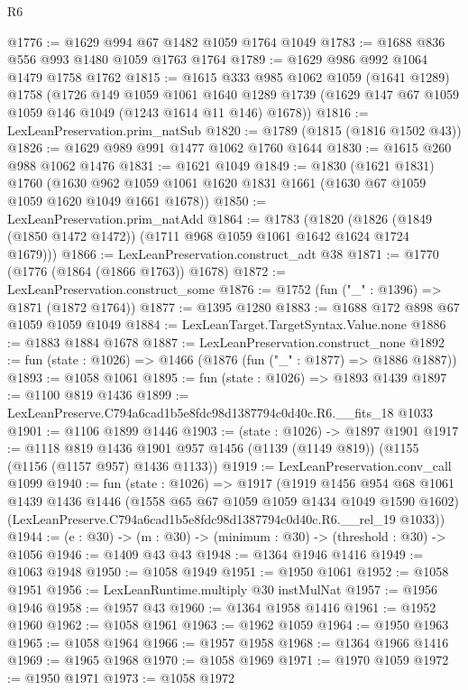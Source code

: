 \begin{lexlean}{R6}
\begin{coremodule}
@1776 := @1629 @994 @67 @1482 @1059 @1764 @1049
@1783 := @1688 @836 @556 @993 @1480 @1059 @1763 @1764
@1789 := @1629 @986 @992 @1064 @1479 @1758 @1762
@1815 := @1615
    @333
    @985
    @1062
    @1059
    (@1641 @1289)
    @1758
    (@1726
      @149
      @1059
      @1061
      @1640
      @1289
      @1739
      (@1629 @147 @67 @1059 @1059 @146 @1049 (@1243 @1614 @11 @146) @1678))
@1816 := LexLeanPreservation.prim_natSub
@1820 := @1789 (@1815 (@1816 @1502 @43))
@1826 := @1629 @989 @991 @1477 @1062 @1760 @1644
@1830 := @1615 @260 @988 @1062 @1476
@1831 := @1621 @1049
@1849 := @1830
    (@1621 @1831)
    @1760
    (@1630 @962 @1059 @1061 @1620 @1831 @1661 (@1630 @67 @1059 @1059 @1620 @1049 @1661 @1678))
@1850 := LexLeanPreservation.prim_natAdd
@1864 := @1783
    (@1820 (@1826 (@1849 (@1850 @1472 @1472)) (@1711 @968 @1059 @1061 @1642 @1624 @1724 @1679)))
@1866 := LexLeanPreservation.construct_adt @38
@1871 := @1770 (@1776 (@1864 (@1866 @1763)) @1678)
@1872 := LexLeanPreservation.construct_some
@1876 := @1752 (fun ("_" : @1396) => @1871 (@1872 @1764))
@1877 := @1395 @1280
@1883 := @1688 @172 @898 @67 @1059 @1059 @1049
@1884 := LexLeanTarget.TargetSyntax.Value.none
@1886 := @1883 @1884 @1678
@1887 := LexLeanPreservation.construct_none
@1892 := fun (state : @1026) => @1466 (@1876 (fun ("_" : @1877) => @1886 @1887))
@1893 := @1058 @1061
@1895 := fun (state : @1026) => @1893 @1439
@1897 := @1100 @819 @1436
@1899 := LexLeanPreserve.C794a6cad1b5e8fdc98d1387794c0d40c.R6.__fits_18 @1033
@1901 := @1106 @1899 @1446
@1903 := (state : @1026) -> @1897 @1901
@1917 := @1118
    @819
    @1436
    @1901
    @957
    @1456
    (@1139 (@1149 @819))
    (@1155 (@1156 (@1157 @957) @1436 @1133))
@1919 := LexLeanPreservation.conv_call @1099
@1940 := fun (state : @1026) =>
  @1917
    (@1919
      @1456
      @954
      @68
      @1061
      @1439
      @1436
      @1446
      (@1558 @65 @67 @1059 @1059 @1434 @1049 @1590 @1602)
      (LexLeanPreserve.C794a6cad1b5e8fdc98d1387794c0d40c.R6.__rel_19 @1033))
@1944 := (e : @30) -> (m : @30) -> (minimum : @30) -> (threshold : @30) -> @1056
@1946 := @1409 @43 @43
@1948 := @1364 @1946 @1416
@1949 := @1063 @1948
@1950 := @1058 @1949
@1951 := @1950 @1061
@1952 := @1058 @1951
@1956 := LexLeanRuntime.multiply @30 instMulNat
@1957 := @1956 @1946
@1958 := @1957 @43
@1960 := @1364 @1958 @1416
@1961 := @1952 @1960
@1962 := @1058 @1961
@1963 := @1962 @1059
@1964 := @1950 @1963
@1965 := @1058 @1964
@1966 := @1957 @1958
@1968 := @1364 @1966 @1416
@1969 := @1965 @1968
@1970 := @1058 @1969
@1971 := @1970 @1059
@1972 := @1950 @1971
@1973 := @1058 @1972

\end{coremodule}
\end{lexlean}
